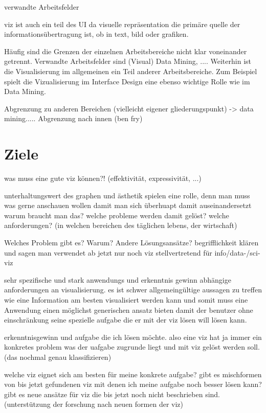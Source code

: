 \documentclass[a4paper, 12pt, onepage, pdftex, headsepline, footsepline]{scrreprt}
\begin{document}
verwandte Arbeitsfelder

viz ist auch ein teil des UI da visuelle repräsentation die primäre quelle der informationsübertragung ist, ob in text, bild oder grafiken.

Häufig sind die Grenzen der einzelnen Arbeitsbereiche nicht klar voneinander getrennt. Verwandte Arbeitsfelder sind (Visual) Data Mining, ....
Weiterhin ist die Visualisierung im allgemeinen ein Teil anderer Arbeitsbereiche. Zum Beispiel spielt die Vizualisierung im Interface Design eine ebenso wichtige Rolle wie im Data Mining.

Abgrenzung zu anderen Bereichen (vielleicht eigener gliederungspunkt) -> data mining.....
Abgrenzung nach innen (ben fry)

\section{Ziele}

was muss eine gute viz können?! (effektivität, expressivität, ...)

unterhaltungswert des graphen und ästhetik spielen eine rolle, denn man muss was gerne anschauen wollen damit man sich überhuapt damit auseinandersetzt
warum braucht man das? welche probleme werden damit gelöst?
welche anforderungen? (in welchen bereichen des täglichen lebens, der wirtschaft)

Welches Problem gibt es?
Warum?
Andere Lösungsansätze?
begrifflichkeit klären und sagen man verwendet ab jetzt nur noch viz stellvertretend für info/data-/sci-viz

sehr spezifische und stark anwendungs und erkenntnis gewinn abhängige anforderungen an visualisierung. 
es ist schwer allgemeingültige aussagen zu treffen wie eine Information am besten visualisiert werden kann und somit muss eine Anwendung einen möglichst generischen ansatz bieten damit der benutzer ohne einschränkung seine spezielle aufgabe die er mit der viz lösen will lösen kann.

erkenntnisgewinn und aufgabe die ich lösen möchte. also eine viz hat ja immer ein konkretes problem was der uafgabe zugrunde liegt und mit viz gelöst werden soll. (das nochmal genau klassifizieren)

welche viz eignet sich am besten für meine konkrete aufgabe?
gibt es mischformen von bis jetzt gefundenen viz mit denen ich meine aufgabe noch besser lösen kann?
gibt es neue ansätze für viz die bis jetzt noch nicht beschrieben sind. (unterstützung der forschung nach neuen formen der viz)
\end{document}

